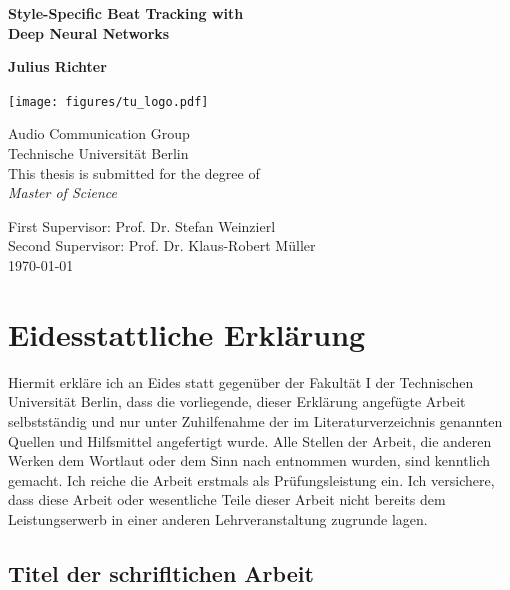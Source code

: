 \documentclass{scrartcl}
\begin{document}
\pagestyle{plain}

\begin{titlepage}
\begin{center}
\vspace*{1cm}
\huge
\textbf{Style-Specific Beat Tracking with\\ Deep Neural Networks}
\vspace{2.0cm}

\Large
\textbf{Julius Richter}
\vspace{0.8cm}

\texttt{[image: figures/tu\_logo.pdf]}

\vspace{0.4cm}
Audio Communication Group\\
Technische Universität Berlin\\
\vspace{2.5cm}
This thesis is submitted for the degree of\\
\emph{Master of Science}

\vspace{2.5cm}
First Supervisor: Prof. Dr. Stefan Weinzierl \\
Second Supervisor: Prof. Dr. Klaus-Robert Müller\\
\vspace{1.5cm}
\today
\end{center}
\end{titlepage}


\section*{Eidesstattliche Erklärung}
Hiermit erkläre ich an Eides statt gegenüber der Fakultät I der Technischen Universität Berlin, dass die vorliegende, dieser Erklärung angefügte Arbeit selbstständig und nur unter Zuhilfenahme der im Literaturverzeichnis genannten Quellen und Hilfsmittel angefertigt wurde. Alle Stellen der Arbeit, die anderen
Werken dem Wortlaut oder dem Sinn nach entnommen wurden, sind kenntlich gemacht. Ich reiche die Arbeit erstmals als Prüfungsleistung ein. Ich versichere, dass diese Arbeit oder wesentliche Teile dieser Arbeit nicht bereits dem Leistungserwerb in einer anderen Lehrveranstaltung zugrunde lagen. 

\vspace{1em}
\subsection*{Titel der schrifltichen Arbeit}
\end{document}
